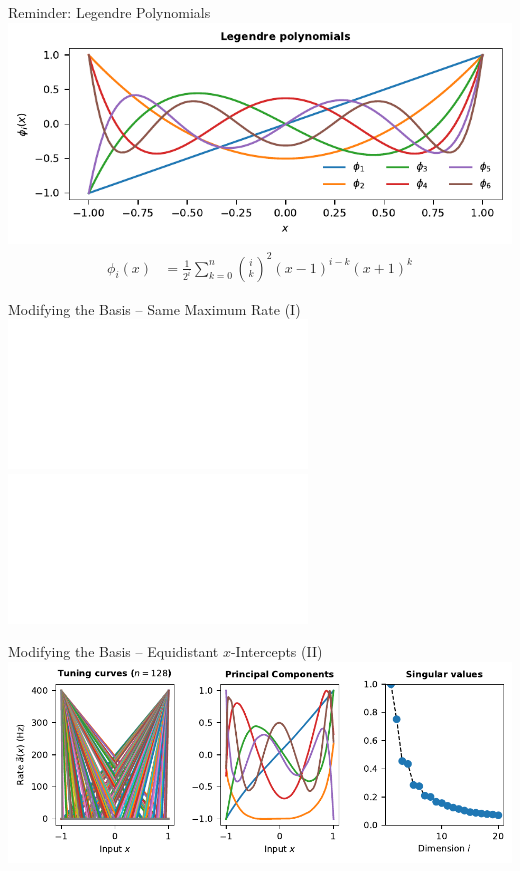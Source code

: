 \documentclass[handout,aspectratio=169]{beamer}
\begin{document}
	\begin{frame}{Reminder: Legendre Polynomials}
		\centering
		\includegraphics{media/legendre.pdf}
		\begin{align*}
			\phi_i(x)&= \frac{1}{2^i} \sum_{k=0}^n \binom{i}{k}^2 (x-1)^{i-k}(x+1)^k
		\end{align*}
		\begin{overlayarea}{\textwidth}{0.5cm}
			\centering
		\end{overlayarea}
	\end{frame}

	\begin{frame}{Modifying the Basis -- Same Maximum Rate (I)}
		\centering%
		\includegraphics<1>[width=\textwidth]{media/tuning_curve_relu_pca.pdf}%
		\includegraphics<2->[width=\textwidth]{media/tuning_curve_relu_pca_fix_max_rate.pdf}
		\begin{overlayarea}{\textwidth}{0.5cm}
			\centering
		\end{overlayarea}
	\end{frame}


	\begin{frame}{Modifying the Basis -- Equidistant $x$-Intercepts (II)}
		\centering%
		\includegraphics[width=\textwidth]{media/tuning_curve_relu_pca_fix_max_rate_intercepts_i.pdf}
		\begin{overlayarea}{\textwidth}{0.5cm}
			\centering
		\end{overlayarea}
	\end{frame}
\end{document}
